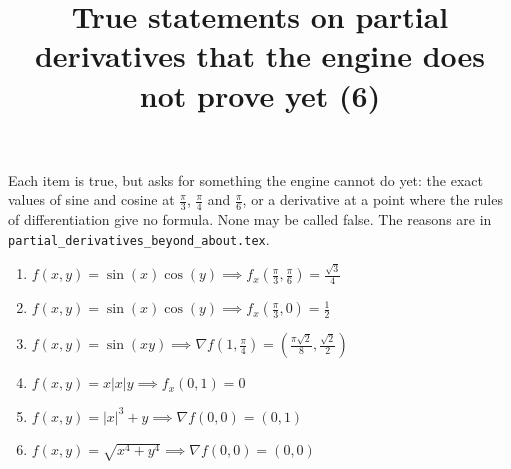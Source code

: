 \documentclass[11pt,a4paper]{article}
\title{True statements on partial derivatives that the engine does not prove yet (6)}
\author{}
\date{}
\begin{document}
\maketitle
Each item is true, but asks for something the engine cannot do yet: the exact values of sine and cosine at $\frac{\pi}{3}$, $\frac{\pi}{4}$ and $\frac{\pi}{6}$, or a derivative at a point where the rules of differentiation give no formula. None may be called false. The reasons are in \texttt{partial\_derivatives\_beyond\_about.tex}.

\begin{enumerate}
\item $\displaystyle f(x, y) = \sin(x) \cos(y) \implies f_{x}\left( \frac{\pi}{3}, \frac{\pi}{6} \right) = \frac{\sqrt{3}}{4}$
\item $\displaystyle f(x, y) = \sin(x) \cos(y) \implies f_{x}\left( \frac{\pi}{3}, 0 \right) = \frac{1}{2}$
\item $\displaystyle f(x, y) = \sin(xy) \implies \nabla f\left( 1, \frac{\pi}{4} \right) = \left( \frac{\pi \sqrt{2}}{8}, \frac{\sqrt{2}}{2} \right)$
\item $\displaystyle f(x, y) = x |x| y \implies f_{x}(0, 1) = 0$
\item $\displaystyle f(x, y) = |x|^{3} + y \implies \nabla f(0, 0) = (0, 1)$
\item $\displaystyle f(x, y) = \sqrt{x^{4} + y^{4}} \implies \nabla f(0, 0) = (0, 0)$
\end{enumerate}
\end{document}
